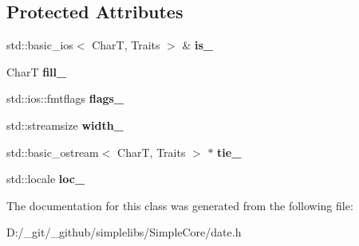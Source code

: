 \subsection*{Protected Attributes}
\begin{DoxyCompactItemize}
\item 
\mbox{\label{classdate_1_1detail_1_1save__istream_a93950d85f86e5060ad67f0cebcef2f80}} 
std\+::basic\+\_\+ios$<$ CharT, Traits $>$ \& {\bfseries is\+\_\+}
\item 
\mbox{\label{classdate_1_1detail_1_1save__istream_afbd495e08ab4dc7b9f066c3af78d0126}} 
CharT {\bfseries fill\+\_\+}
\item 
\mbox{\label{classdate_1_1detail_1_1save__istream_a9e530cad88e11729a8bcc3ee371ee11f}} 
std\+::ios\+::fmtflags {\bfseries flags\+\_\+}
\item 
\mbox{\label{classdate_1_1detail_1_1save__istream_a3620b03c8a6cbcbf93675558b0303c44}} 
std\+::streamsize {\bfseries width\+\_\+}
\item 
\mbox{\label{classdate_1_1detail_1_1save__istream_a6c4f3f37695579bfc7d0175ae8ab2e82}} 
std\+::basic\+\_\+ostream$<$ CharT, Traits $>$ $\ast$ {\bfseries tie\+\_\+}
\item 
\mbox{\label{classdate_1_1detail_1_1save__istream_af8c6b536bd604594fb6a73d85520948f}} 
std\+::locale {\bfseries loc\+\_\+}
\end{DoxyCompactItemize}


The documentation for this class was generated from the following file\+:\begin{DoxyCompactItemize}
\item 
D\+:/\+\_\+git/\+\_\+github/simplelibs/\+Simple\+Core/date.\+h\end{DoxyCompactItemize}

